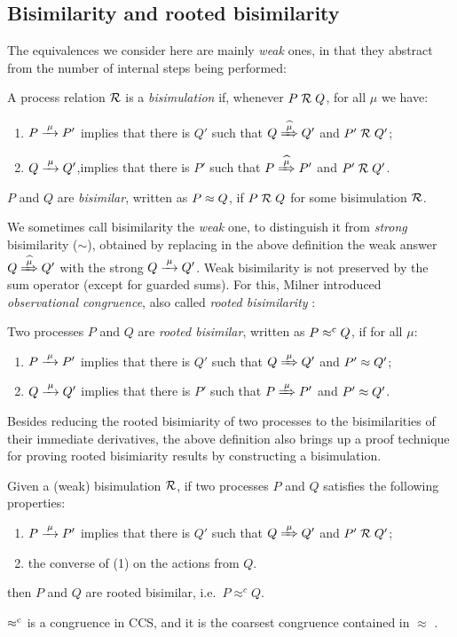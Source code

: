 \subsection{Bisimilarity and rooted bisimilarity}
\label{ss:BiEx}

The equivalences we consider here are mainly \emph{weak} ones, in that they
abstract from the number of internal steps being performed:
\begin{definition}%
\label{d:wb}
A process relation ${{\cal R}}$ is a \emph{bisimulation} if, whenever
 $P\mathrel{\cal R} Q$, for all $\mu$ we have:
\begin{enumerate}
\item $P \arr\mu P'$ implies that there is $Q'$ such that $Q \Arcap \mu Q'$ and $P' \mathrel{\cal R} Q'$;
\item $Q \arr\mu Q'$,implies that there is $P'$ such that $P \Arcap
  \mu P'$ and $P' \mathrel{\cal R} Q'$\enspace.
\end{enumerate}
 $P$ and $Q$ are \emph{bisimilar},
written as $P \approx Q$, if $P \mathrel{\cal R} Q$ for some bisimulation ${\cal R}$.
\end{definition}

We sometimes call bisimilarity the \emph{weak} one, to
distinguish it from \emph{strong} bisimilarity ($\sim$),
obtained by replacing in the above definition   the weak answer $
Q\Arcap\mu Q'$ with the strong  $Q \arr \mu Q'$.
Weak bisimilarity is not preserved by the sum operator (except for
guarded sums). For this, Milner introduced \emph{observational congruence}, also called \emph{rooted
  bisimilarity} \cite{Gorrieri:2015jt,Sangiorgi:2011ut}:
\begin{definition}%
\label{d:rootedBisimilarity}
Two processes $P$ and $Q$ are \emph{rooted bisimilar}, written as $P
\mathrel{\approx^{\rm{c}}} Q$, if
for all $\mu$:
\begin{enumerate}
 \item  $P \arr\mu P'$ implies that there is $Q'$ such that $Q
   \Arr\mu Q'$ and $P' \approx Q'$;
 \item  $Q \arr\mu Q'$ implies that there is $P'$ such that $P
   \Arr\mu P'$ and $P' \approx Q'$\enspace.
\end{enumerate}
\end{definition}

Besides reducing the rooted bisimiarity of two processes to
the bisimilarities of their immediate derivatives, the
above definition also brings up a proof technique for proving  rooted
bisimiarity results  by constructing a bisimulation.
\begin{lemma}%
\label{l:obsCongrByWeakBisim}
Given a (weak) bisimulation $\mathrel{\cal R}$, if two processes $P$ and $Q$
satisfies the following properties:
\begin{enumerate}
\item $P \arr\mu P'$ implies that there is $Q'$ such that $Q
   \Arr\mu Q'$ and $P' \mathrel{\cal R} Q'$;
\item the converse of (1) on the actions from $Q$.
\end{enumerate}
then $P$ and $Q$ are rooted bisimilar, i.e.~$P \approx^c Q$.
\end{lemma}

\begin{theorem}
\label{t:rapproxCongruence}
$\mathrel{\approx^{\rm{c}}}$ is a congruence in CCS, and it is the
coarsest congruence contained in $\approx$ \cite{van2005characterisation}.
\end{theorem}

